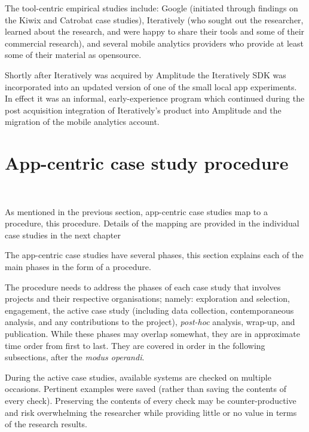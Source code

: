 The tool-centric empirical studies include: Google (initiated through findings on the Kiwix and Catrobat case studies), Iteratively (who sought out the researcher, learned about the research, and were happy to share their tools and some of their commercial research), and several mobile analytics providers who provide at least some of their material as opensource. 

Shortly after Iteratively was acquired by Amplitude the Iteratively SDK was incorporated into an updated version of one of the small local app experiments. In effect it was an informal, early-experience program which continued during the post acquisition integration of Iteratively's product into Amplitude and the migration of the mobile analytics account.


\section{App-centric case study procedure}~\label{methodology-app-centric-case-study-procedure}

As mentioned in the previous section, app-centric case studies map to a procedure, this procedure. Details of the mapping are provided in the individual case studies in the next chapter~

The app-centric case studies have several phases, this section explains each of the main phases in the form of a procedure.

The procedure needs to address the phases of each case study that involves projects and their respective organisations; namely: exploration and selection, engagement, the active case study (including data collection, contemporaneous analysis, and any contributions to the project), \emph{post-hoc} analysis, wrap-up, and publication. While these phases may overlap somewhat, they are in approximate time order from first to last. They are covered in order in the following subsections, after the \emph{modus operandi}.

During the active case studies, available systems are checked on multiple occasions. Pertinent examples were saved (rather than saving the contents of every check). Preserving the contents of every check may be counter-productive and risk overwhelming the researcher while providing little or no value in terms of the research results. 

